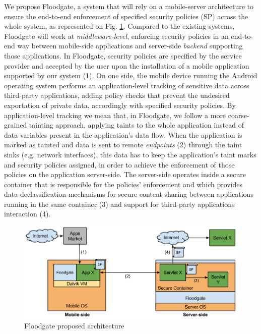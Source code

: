 We propose Floodgate, a system that will rely on a mobile-server architecture to ensure the end-to-end enforcement of specified security policies (SP) across the whole system, as represented on Fig. \ref{fig:floodgate-arch}. Compared to the existing systems, Floodgate will work at \textit{middleware-level}, enforcing security policies in an end-to-end way between mobile-side applications and server-side \textit{backend} supporting those applications. In Floodgate, security policies are specified by the service provider and accepted by the user upon the installation of a mobile application supported by our system (1). On one side, the mobile device running the Android operating system performs an application-level tracking of sensitive data across third-party applications, adding policy checks that prevent the undesired exportation of private data, accordingly with specified security policies. By application-level tracking we mean that, in Floodgate, we follow a more coarse-grained tainting approach, applying taints to the whole application instead of data variables present in the application's data flow. When the application is marked as tainted and data is sent to remote \textit{endpoints} (2) through the taint sinks (e.g. network interfaces), this data has to keep the application's taint marks and security policies assigned, in order to achieve the enforcement of those policies on the application server-side. The server-side operates inside a secure container that is responsible for the policies' enforcement and which provides data declassification mechanisms for secure content sharing between applications running in the same container (3) and support for third-party applications interaction (4).

\begin{figure}[t!]
\includegraphics[width=\textwidth]{figs/floodgate-arch}
\centering
\caption{Floodgate proposed architecture}
\label{fig:floodgate-arch}
\end{figure}

